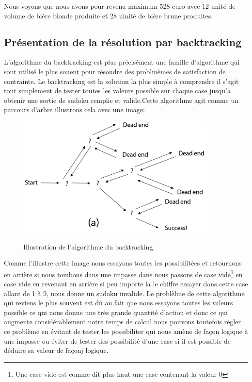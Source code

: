 Nous voyons que nous avons pour revenu maximum 528 euro avec 12 unité de volume de bière blonde produite et 28 uinité de bière brune produites.

\subsection{Présentation de la résolution par backtracking}
L'algorithme du backtracking est plus précisément une famille d'algorithme qui sont utilisé le plus souent pour résoudre des problmèmes de satisfaction de contrainte.
Le backtracking est la solution la plus simple à comprendre il s'agit tout simplement de tester toutes les valeurs possible sur chaque case jusqu'a obtenir une sortie de sudoku remplie et valide.Cette algorithme agit comme un parcours d'arbre illustrons cela avec une image:\newline

\begin{figure}[h]
  \begin{center}
\includegraphics[width=10cm]{./images/backtracking.png}\label{Backtracking}
\caption{Illustration de l'algorithme du backtracking.}
\end{center}
\end{figure}

Comme l'illustre cette image nous essayons toutes les possibilitées et retournons en arrière si nous tombons dans une impasse dans nous passons de case vide\footnote{\label{vide}Une case vide est comme dit plus haut une case contenant la valeur 0} en case vide en revenant en arrière si peu importe la le chiffre essayer dans cette case allant de 1 à 9, nous donne un sudoku invalide. Le problèlme de cette algorithme qui reviens le plus souvent est dù au fait que nous essayons toutes les valeurs possible ce qui nous donne une très grande quantité d'action et donc ce qui augmente considérablement notre temps de calcul nous pouvons toutefois régler ce problème en évitant de tester les possibiliter qui nous amène de façon logique à une impasse ou éviter de tester des possibilité d'une case si il est possible de déduire sa valeur de façonj logique.
